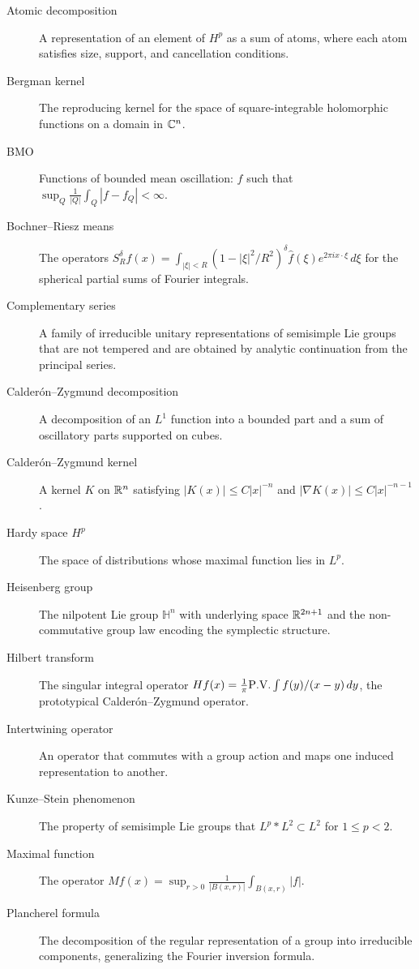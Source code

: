 \begin{description}
    \item[Atomic decomposition] A representation of an element of \(H^p\) as a sum of atoms, where each atom satisfies size, support, and cancellation conditions.
    \item[Bergman kernel] The reproducing kernel for the space of square-integrable holomorphic functions on a domain in \(\mathbb{C}^n\).
    \item[BMO] Functions of bounded mean oscillation: \(f\) such that \(\sup_Q \frac1{|Q|} \int_Q |f - f_Q| < \infty\).
    \item[Bochner--Riesz means] The operators \(S_R^\delta f(x) = \int_{|\xi| < R} (1 - |\xi|^2/R^2)^\delta \widehat{f}(\xi) e^{2\pi i x\cdot\xi}\,d\xi\) for the spherical partial sums of Fourier integrals.
    \item[Complementary series] A family of irreducible unitary representations of semisimple Lie groups that are not tempered and are obtained by analytic continuation from the principal series.
    \item[Calder\'on--Zygmund decomposition] A decomposition of an \(L^1\) function into a bounded part and a sum of oscillatory parts supported on cubes.
    \item[Calder\'on--Zygmund kernel] A kernel \(K\) on \(\mathbb{R}^n\) satisfying \(|K(x)| \leq C|x|^{-n}\) and \(|\nabla K(x)| \leq C|x|^{-n-1}\).
    \item[Hardy space \(H^p\)] The space of distributions whose maximal function lies in \(L^p\).
    \item[Heisenberg group] The nilpotent Lie group \(\mathbb{H}^n\) with underlying space \(\mathbb{R}^{2n+1}\) and the non-commutative group law encoding the symplectic structure.
    \item[Hilbert transform] The singular integral operator \(Hf(x) = \frac1\pi \PV \int f(y)/(x-y)\,dy\), the prototypical Calder\'on--Zygmund operator.
    \item[Intertwining operator] An operator that commutes with a group action and maps one induced representation to another.
    \item[Kunze--Stein phenomenon] The property of semisimple Lie groups that \(L^p * L^2 \subset L^2\) for \(1 \leq p < 2\).
    \item[Maximal function] The operator \(Mf(x) = \sup_{r>0} \frac1{|B(x,r)|} \int_{B(x,r)} |f|\).
    \item[Plancherel formula] The decomposition of the regular representation of a group into irreducible components, generalizing the Fourier inversion formula.

\end{description}
